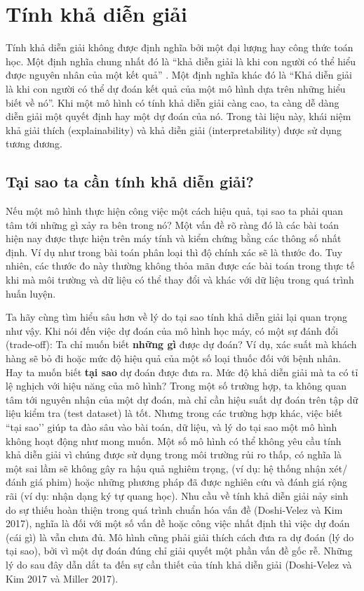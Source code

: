 \chapter{Tính khả diễn giải}
Tính khả diễn giải không được định nghĩa bởi một đại lượng hay công thức toán học. Một định nghĩa chung nhất đó là ``khả diễn giải là khi con người có thể hiểu được nguyên nhân của một kết quả'' . Một định nghĩa khác đó là ``Khả diễn giải là khi con người có thể dự đoán kết quả của một mô hình dựa trên những hiểu biết về nó''. Khi một mô hình có tính khả diễn giải càng cao, ta càng dễ dàng diễn giải một quyết định hay một dự đoán của nó. Trong tài liệu này, khái niệm khả giải thích (explainability) và khả diễn giải (interpretability) được sử dụng tương đương.

\clearpage

\section{Tại sao ta cần tính khả diễn giải?}
Nếu một mô hình thực hiện công việc một cách hiệu quả, tại sao ta phải quan tâm tới những gì xảy ra bên trong nó? Một vấn đề rõ ràng đó là các bài toán hiện nay được thực hiện trên máy tính và kiểm chứng bằng các thông số nhất định. Ví dụ như trong bài toán phân loại thì độ chính xác sẽ là thước đo. Tuy nhiên, các thước đo này thường không thỏa mãn được các bài toán trong thực tế khi mà môi trường và dữ liệu có thể thay đổi và khác với dữ liệu trong quá trình huấn luyện.

Ta hãy cùng tìm hiểu sâu hơn về lý do tại sao tính khả diễn giải lại quan trọng như vậy. Khi nói đến việc dự đoán của mô hình học máy, có một sự đánh đổi (trade-off): Ta chỉ muốn biết \textbf{những gì} được dự đoán? Ví dụ, xác suất mà khách hàng sẽ bỏ đi hoặc mức độ hiệu quả của một số loại thuốc đối với bệnh nhân. Hay ta muốn biết \textbf{tại sao} dự đoán được đưa ra. Mức độ khả diễn giải mà ta có tỉ lệ nghịch với hiệu năng của mô hình? Trong một số trường hợp, ta không quan tâm tới nguyên nhận của một dự đoán, mà chỉ cần hiệu suất dự đoán trên tập dữ liệu kiểm tra (test dataset) là tốt. Nhưng trong các trường hợp khác, việc biết ``tại sao’’ giúp ta đào sâu vào bài toán, dữ liệu, và lý do tại sao một mô hình không hoạt động như mong muốn. Một số mô hình có thể không yêu cầu tính khả diễn giải vì chúng được sử dụng trong môi trường rủi ro thấp, có nghĩa là một sai lầm sẽ không gây ra hậu quả nghiêm trọng, (ví dụ: hệ thống nhận xét/ đánh giá phim) hoặc những phương pháp đã được nghiên cứu và đánh giá rộng rãi (ví dụ: nhận dạng ký tự quang học). Nhu cầu về tính khả diễn giải nảy sinh do sự thiếu hoàn thiện trong quá trình chuẩn hóa vấn đề (Doshi-Velez và Kim 2017), nghĩa là đối với một số vấn đề hoặc công việc nhất định thì việc dự đoán (cái gì) là vẫn chưa đủ. Mô hình cũng phải giải thích cách đưa ra dự đoán (lý do tại sao), bởi vì một dự đoán đúng chỉ giải quyết một phần vấn đề gốc rễ. Những lý do sau đây dẫn dắt ta đến sự cần thiết của tính khả diễn giải (Doshi-Velez và Kim 2017 và Miller 2017).


